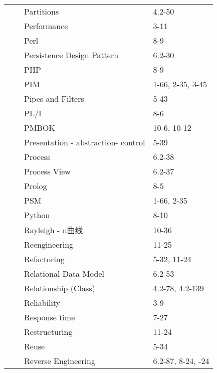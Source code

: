 \documentclass[twocolumn]{article}
\begin{document}
\begin{tabular}{ | >{\bfseries}m{0.5em} | >{\bfseries}m{1em} | m{12em} | m{8em} |}
 &  & Partitions & 4.2-50\\ \cline{3-4}
 &  & Performance & 3-11\\ \cline{3-4}
 &  & Perl & 8-9\\ \cline{3-4}
 &  & Persistence Design \newline Pattern & 6.2-30\\ \cline{3-4}
 &  & PHP & 8-9\\ \cline{3-4}
 &  & PIM & 1-66, 2-35, 3-45\\ \cline{3-4}
 &  & Pipes and Filters & 5-43\\ \cline{3-4}
 &  & PL/I & 8-6\\ \cline{3-4}
 &  & PMBOK & 10-6, 10-12\\ \cline{3-4}
 &  & Presentation - \newline abstraction- control & 5-39\\ \cline{3-4}
 &  & Process & 6.2-38\\ \cline{3-4}
 &  & Process View & 6.2-37\\ \cline{3-4}
 &  & Prolog & 8-5\\ \cline{3-4}
 &  & PSM & 1-66, 2-35\\ \cline{3-4}
 &  & Python & 8-10\\ \cline{2-4}
 & \multirow{14}{1em}{R \newline  \newline  \newline  \newline  \newline R \newline  \newline  \newline  \newline  \newline R} & Rayleigh - n曲线 & 10-36\\ \cline{3-4}
 &  & Reengineering & 11-25\\ \cline{3-4}
 &  & Refactoring & 5-32, 11-24\\ \cline{3-4}
 &  & Relational Data Model & 6.2-53\\ \cline{3-4}
 &  & Relationship (Class) & 4.2-78, 4.2-139\\ \cline{3-4}
 &  & Reliability & 3-9\\ \cline{3-4}
 &  & Response time & 7-27\\ \cline{3-4}
 &  & Restructuring & 11-24\\ \cline{3-4}
 &  & Reuse & 5-34\\ \cline{3-4}
 &  & Reverse Engineering & 6.2-87, 8-24, \newline 11-24\\ \cline{3-4}

\end{tabular}
\end{document}
